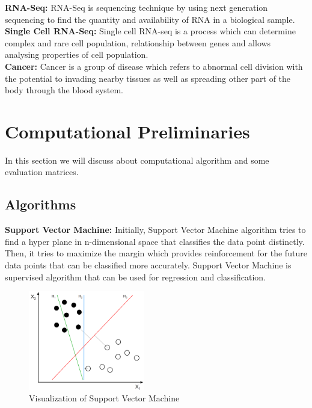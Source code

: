 \textbf{RNA-Seq:} RNA-Seq is sequencing technique by using next generation sequencing to find the quantity and availability of RNA in a biological sample.\\[5pt]

\textbf{Single Cell RNA-Seq:} Single cell RNA-seq is a process which can determine complex and rare cell population, relationship between genes and allows analysing properties of cell population.\\[5pt]

\textbf{Cancer:} Cancer is a group of disease which refers to abnormal cell division with the potential to invading nearby tissues as well as spreading other part of the body through the blood system. \\[5pt] 

\section{Computational Preliminaries}
\label{comp_pre}
In this section we will discuss about computational algorithm and some evaluation matrices.
\subsection{Algorithms}
\textbf{Support Vector Machine:} Initially, Support Vector Machine algorithm tries to find a hyper plane in n-dimensional space that classifies the data point distinctly. Then, it tries to maximize the margin which provides reinforcement for the future data points that can be classified more accurately. Support Vector Machine is supervised algorithm that can be used for regression and classification.

\begin{figure}[H]
    \centering
    \includegraphics[width=0.45\textwidth]{svm}
    \caption{Visualization of Support Vector Machine \cite{wiki:Support-vector_machine} }
    \label{fig:SVMfig}
\end{figure}

